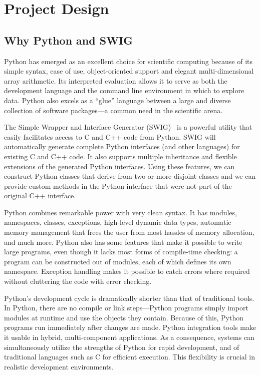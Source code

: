 \documentclass[acmtocl]{acmtrans2m}
\begin{document}
\section{Project Design}
\label{sec:design}

\subsection{Why Python and SWIG}
\label{sec:why}

Python has emerged as an excellent choice for scientific computing
because of its simple syntax, ease of use, object-oriented support and
elegant multi-dimensional array arithmetic.  Its interpreted
evaluation allows it to serve as both the development language and the
command line environment in which to explore data.  Python also excels
as a ``glue'' language between a large and diverse collection of
software packages---a common need in the scientific arena.

The Simple Wrapper and Interface Generator (SWIG)~\cite{swig} is a
powerful utility that easily facilitates access to C and C++ code from
Python.  SWIG will automatically generate complete Python interfaces
(and other languages) for existing C and C++ code.  It also supports
multiple inheritance and flexible extensions of the generated Python
interfaces.  Using these features, we can construct Python classes
that derive from two or more disjoint classes and we can provide
custom methods in the Python interface that were not part of the
original C++ interface.

Python combines remarkable power with very clean syntax.  It has
modules, namespaces, classes, exceptions, high-level dynamic data
types, automatic memory management that frees the user from most
hassles of memory allocation, and much more.  Python also has some
features that make it possible to write large programs, even though it
lacks most forms of compile-time checking: a program can be
constructed out of modules, each of which defines its own namespace.
Exception handling makes it possible to catch errors where required
without cluttering the code with error checking.

Python's development cycle is dramatically shorter than that of
traditional tools.  In Python, there are no compile or link
steps---Python programs simply import modules at runtime and use the
objects they contain.  Because of this, Python programs run
immediately after changes are made.  Python integration tools make it
usable in hybrid, multi-component applications.  As a consequence,
systems can simultaneously utilize the strengths of Python for rapid
development, and of traditional languages such as C for efficient
execution.  This flexibility is crucial in realistic development
environments.
\end{document}
